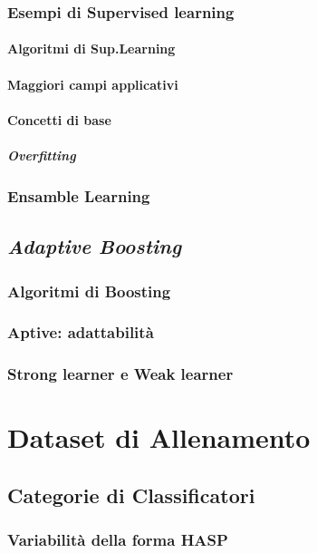             \subsubsection{Esempi di Supervised learning}
                \paragraph{Algoritmi di Sup.Learning}
                \paragraph{Maggiori campi applicativi}
                \paragraph{Concetti di base}
                    \subparagraph{Overfitting}
            \subsubsection{Ensamble Learning}
        \subsection{\emph{Adaptive Boosting}}
        \label{sub:adaptive_boosting}
            \subsubsection{Algoritmi di Boosting}
            \subsubsection{Aptive: adattabilità}
            \subsubsection{Strong learner e Weak learner}
    \section{Dataset di Allenamento}
    \label{sec:training_dataset}
        \subsection{Categorie di Classificatori}
        \label{sub:classifiers_categories}
            \subsubsection{Variabilità della forma HASP}
